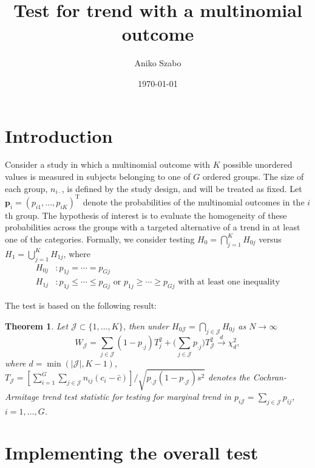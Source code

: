 \documentclass[reqno]{amsart}
\title{Test for trend with a multinomial outcome}
\author{Aniko Szabo}
\date{\today}
\newcommand{\pvec}{\mathbf{p}}
\def\T{{ \mathrm{\scriptscriptstyle T} }}
\newcommand{\setJ}{\mathcal{J}}
\newtheorem{theorem}{Theorem}
\begin{document}
\maketitle


\section{Introduction}

Consider a study in which a multinomial outcome with $K$ possible unordered values is measured in subjects belonging to one of $G$ ordered groups.
The size of each group, $n_{i\cdot}$, is defined by the study design, and will be treated as fixed.
Let $\pvec_i=(p_{i1},\ldots,p_{iK})^\T$ denote the probabilities of the multinomial outcomes in the $i$th group. The hypothesis of interest is to
evaluate the homogeneity of these probabilities across the groups with a targeted alternative of a trend in at least one of the categories.
Formally, we consider testing $H_0 = \bigcap_{j=1}^K H_{0j}$ versus $H_1 = \bigcup_{j=1}^K H_{1j}$, where
\begin{equation}
\begin{aligned}
  H_{0j}& :  p_{1j}=\cdots = p_{Gj} \\
  H_{1j}& : p_{1j} \leq \cdots \leq p_{Gj} \text{ or }  p_{1j} \geq \cdots \geq p_{Gj} \text{ with at least one inequality}
\end{aligned}
\end{equation}

The test is based on the following result:
\begin{theorem}\label{Th:partial}
Let $\setJ \subset \{1,\ldots,K\}$, then under $H_{0\setJ}=\bigcap_{j\in\setJ}H_{0j}$ as $N\rightarrow\infty$
\begin{equation}
  W_\setJ =  \sum_{j\in\setJ} (1-p_{\cdot j})T^2_j + \big(\sum_{j\in\setJ} p_{\cdot j}\big) T^2_\setJ \xrightarrow{d} \chi^2_{d},
\end{equation}
where $d = \min(|\setJ|, K-1)$,  $T_\setJ = [\sum_{i=1}^G \sum_{j\in\setJ}n_{ij}(c_i-\bar{c})] \big/ \sqrt{p_{\cdot \setJ}(1-p_{\cdot \setJ})s^2}$ denotes the Cochran-Armitage trend test statistic for testing for marginal trend in $p_{i\setJ}=\sum_{j\in\setJ}p_{ij}$, $i=1,\ldots, G$.
\end{theorem}

\section{Implementing the overall test}
\end{document}
